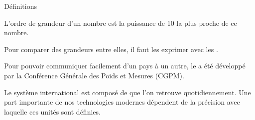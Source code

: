 


\begin{doc}{Définitions}
  \vspace*{-24pt}
  \begin{encart}
  L'ordre de grandeur d'un nombre est la puissance de 10 la plus proche de ce nombre.
  \end{encart}
\end{doc}



\newpage
\vspace*{-36pt}

\vspace*{-12pt}

Pour comparer des grandeurs entre elles, il faut les exprimer avec les . %

Pour pouvoir communiquer facilement d'un pays à un autre, le  a été développé par la Conférence Générale des Poids et Mesures (CGPM). %

Le système international est composé de  que l'on retrouve quotidiennement. Une part importante de nos technologies modernes dépendent de la précision avec laquelle ces unités sont définies.

